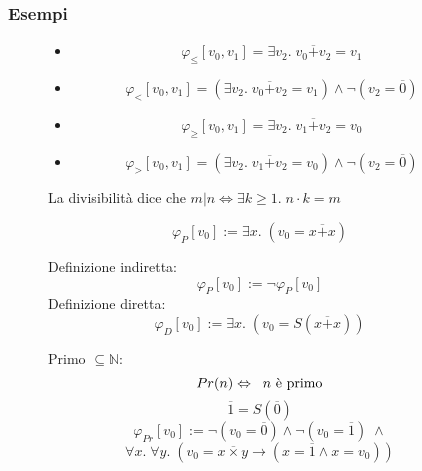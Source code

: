 \documentclass{article}
\theoremstyle{break}
\theoremstyle{break}
\theoremstyle{break}
\theoremstyle{break}
\begin{document}
\subsubsection{Esempi}
\begin{figure}[H]
  \begin{example}[Disuguaglianze]
    \begin{itemize}
      \item 
        \[
          \varphi_{\le} [v_0, v_1] = \exists v_2.\; v_0 \overline{+} v_2 = v_1
        \] 
      \item \[
          \varphi_{<} [v_0, v_1] = (\exists v_2.\; v_0 \overline{+}v_2 = v_1) \wedge \neg(v_2 = \overline{0})
      \] 
      \item \[
      \varphi_{\ge } [v_0, v_1] = \exists v_2.\; v_1 \overline{+} v_2 = v_0
      \] 
      \item \[
      \varphi_{>} [v_0, v_1] = (\exists v_2.\; v_1 \overline{+}v_2 = v_0) \wedge \neg(v_2 = \overline{0})
      \] 
    \end{itemize}
  \end{example}
\end{figure}
\begin{figure}[H]
  \begin{example}
    La divisibilità dice che \( m|n \Leftrightarrow \exists k \ge 1.\; n \cdot k = m \) 
  \end{example}
\end{figure}

\begin{figure}[H]
  \begin{example}
    \[
      \varphi_{P}[v_0] := \exists x.\; (v_0 = x \overline{+} x)
    \] 
  \end{example}
\end{figure}

\begin{figure}[H]
  \begin{example}
    Definizione indiretta:
    \[
      \varphi_{P}[v_0] := \neg \varphi_{P}[v_0]
    \] 
    Definizione diretta:
    \[
      \varphi_{D}[v_0] := \exists x.\; (v_0 = S(x \overline{+} x))
    \] 
  \end{example}
\end{figure}

\begin{figure}[H]
  \begin{example}
    Primo \( \subseteq \mathbb{N} \):
    \[
    Pr(n) \Leftrightarrow \;\; \text{\( n \) è primo}
    \] 
    \[
      \overline{1} = S(\overline{0})
    \] 
    \[
      \varphi_{Pr}[v_0] := \neg(v_0 = \overline{0}) \wedge \neg(v_0 = \overline{1})\; \wedge
    \] 
    \[
     \forall x.\; \forall y.\; (v_0 = x \overline{\times} y \to (x=\overline{1} \wedge x = v_0))
    \] 
  \end{example}
\end{figure}
\end{document}
